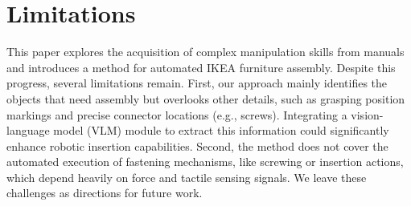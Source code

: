\section{Limitations}
This paper explores the acquisition of complex manipulation skills from manuals and introduces a method for automated IKEA furniture assembly. Despite this progress, several limitations remain. First, our approach mainly identifies the objects that need assembly but overlooks other details, such as grasping position markings and precise connector locations (e.g., screws). Integrating a vision-language model (VLM) module to extract this information could significantly enhance robotic insertion capabilities. Second, the method does not cover the automated execution of fastening mechanisms, like screwing or insertion actions, which depend heavily on force and tactile sensing signals. We leave these challenges as directions for future work.

